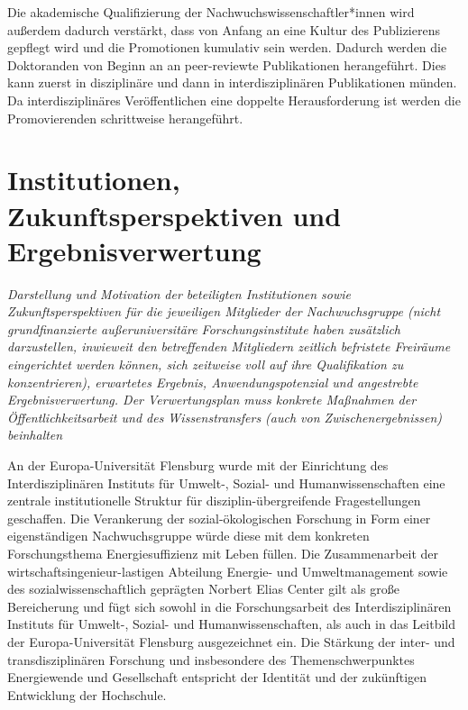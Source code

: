 \documentclass[a4paper,11pt,twoside]{scrartcl}
\begin{document}

Die akademische Qualifizierung der Nachwuchswissenschaftler*innen wird außerdem dadurch verstärkt, dass von Anfang an eine Kultur des Publizierens gepflegt wird und die Promotionen kumulativ sein werden. Dadurch werden die Doktoranden von Beginn an an peer-reviewte Publikationen herangeführt. Dies kann zuerst in disziplinäre und dann in interdisziplinären Publikationen münden. Da interdisziplinäres Veröffentlichen eine doppelte Herausforderung ist werden die Promovierenden schrittweise herangeführt.

\section{Institutionen, Zukunftsperspektiven und Ergebnisverwertung}
\textit{Darstellung und Motivation der beteiligten Institutionen sowie Zukunftsperspektiven für die jeweiligen Mitglieder der Nachwuchsgruppe (nicht grundfinanzierte außeruniversitäre Forschungsinstitute haben zusätzlich darzustellen, inwieweit den betreffenden Mitgliedern zeitlich befristete Freiräume eingerichtet werden können, sich zeitweise voll auf ihre Qualifikation zu konzentrieren), erwartetes Ergebnis, Anwendungspotenzial und angestrebte Ergebnisverwertung. Der Verwertungsplan muss konkrete Maßnahmen der Öffentlichkeitsarbeit und des Wissenstransfers (auch von Zwischenergebnissen) beinhalten}

An der Europa-Universität Flensburg wurde mit der Einrichtung des Interdisziplinären Instituts für Umwelt-, Sozial- und Humanwissenschaften eine zentrale institutionelle Struktur für disziplin-übergreifende Fragestellungen geschaffen. Die Verankerung der sozial-ökologischen Forschung in Form einer eigenständigen Nachwuchsgruppe würde diese mit dem konkreten Forschungsthema Energiesuffizienz mit Leben füllen. Die Zusammenarbeit der wirtschaftsingenieur-lastigen Abteilung Energie- und Umweltmanagement sowie des sozialwissenschaftlich geprägten Norbert Elias Center gilt als große Bereicherung und fügt sich sowohl in die Forschungsarbeit des Interdisziplinären Instituts für Umwelt-, Sozial- und Humanwissenschaften, als auch in das Leitbild der Europa-Universität Flensburg ausgezeichnet ein. Die Stärkung der inter- und transdisziplinären Forschung und insbesondere des Themenschwerpunktes Energiewende und Gesellschaft entspricht der Identität und der zukünftigen Entwicklung der Hochschule.
\end{document}
